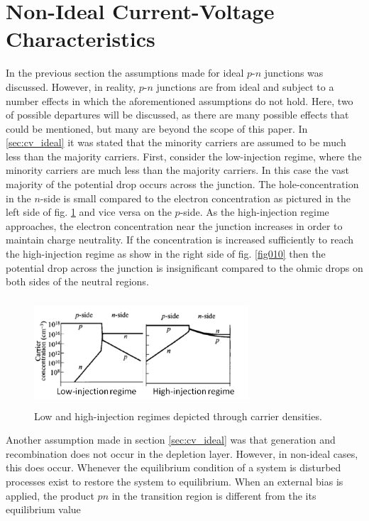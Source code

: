 \section{Non-Ideal Current-Voltage Characteristics}
In the previous section the assumptions made for ideal $p$-$n$ junctions was discussed. However,
in reality, $p$-$n$ junctions are from ideal and subject to a number effects in which the aforementioned assumptions
do not hold. Here, two of possible departures will be discussed, as there are many possible effects that could be mentioned, but many
are beyond the scope of this paper. In \ref{sec:cv_ideal} it was stated that the minority carriers are assumed to be much less than the
majority carriers. First, consider the low-injection regime, where the minority carriers are much less than the majority carriers. In this case
the vast majority of the potential drop occurs across the junction. The hole-concentration in the $n$-side is small compared to the electron concentration
as pictured in the left side of fig. \ref{fig:fig010} and vice versa on the $p$-side. As the high-injection regime approaches, the electron
concentration near the junction increases in order to maintain charge neutrality. If the concentration is increased sufficiently to reach the high-injection regime
as show in the right side of fig. \ref{fig010} then the potential drop across the junction is insignificant compared to the ohmic drops on both sides of the 
neutral regions. 
\begin{figure}[h!]\label{fig:fig010}
    \centering
    \includegraphics[height=4cm,width=8cm]{figs/high_low_injection}
    \caption{Low and high-injection regimes depicted through carrier densities.}
\end{figure}
Another assumption made in section \ref{sec:cv_ideal} was that generation and recombination does not occur in the depletion 
layer. However, in non-ideal cases, this does occur. Whenever the equilibrium condition of a system is disturbed processes exist to restore
the system to equilibrium. When an external bias is applied, the product $pn$ in the transition region is different from the its equilibrium value
